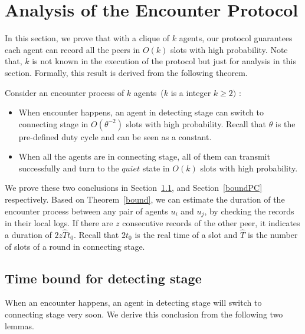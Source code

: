 \section{Analysis of the Encounter Protocol}
\label{sectionanalysis}

In this section, we prove that with a clique of $k$ agents,  
our protocol guarantees each agent can record all
the peers in $O(k)$ slots with high probability.
Note that, $k$ is not known in the execution of the protocol but just for analysis
in this section.
Formally, this result is derived from the following theorem.
\begin{theorem}
    \label{bound}
    Consider an encounter process of $k$ agents~($k$ is a integer $k \geq 2)$ :
    \begin{itemize} 
    \item[(1)] When encounter happens, an agent in detecting stage can switch to connecting stage in $O(\theta^{-2})$
    slots with high probability. Recall that $\theta$ is the pre-defined duty cycle and can be seen as a constant.
    \item[(2)] When all the agents are in connecting stage, all of them can
    transmit successfully and turn to the $quiet$ state 
    in $O(k)$ slots with high probability.
    \end{itemize}
\end{theorem}

We prove these two conclusions in Section~\ref{boundSW}, and
Section~\ref{boundPC} respectively. 
Based on Theorem~\ref{bound}, we can
estimate the duration of the encounter process
between any pair of agents $u_i$ and $u_j$, 
by checking the records in their local logs.  
If there are $z$ consecutive records of the other peer, it indicates a 
duration of $2z\hat{T}t_0$. Recall that $2t_0$ is the real time 
of a slot and $\hat{T}$ is the number of slots of a round in 
connecting stage.

\subsection{Time bound for detecting stage}
\label{boundSW}

When an encounter happens, an agent in detecting stage will switch to connecting stage very soon. 
We derive this conclusion from the following two lemmas.

